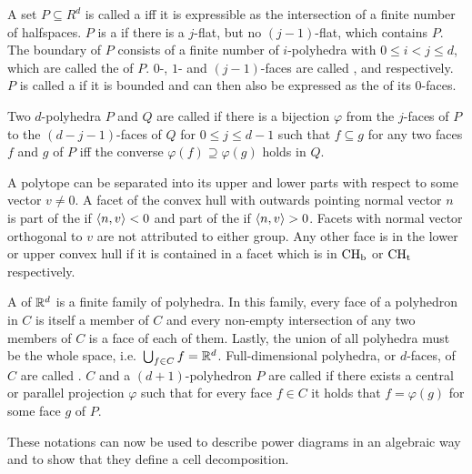 A set $P \subseteq R^d$ is called a  iff it is expressible as the intersection of a finite number of halfspaces.
$P$ is a  if there is a $j$-flat, but no $(j-1)$-flat, which contains $P$.
The boundary of $P$ consists of a finite number of $i$-polyhedra with $0 \leq i < j \leq d$, which are called the  of $P$.
$0$-, $1$- and $(j - 1)$-faces are called ,  and  respectively.
$P$ is called a  if it is bounded and can then also be expressed as the  of its $0$-faces.

Two $d$-polyhedra $P$ and $Q$ are called  if there is a bijection $\varphi$ from the $j$-faces of $P$ to the $(d-j-1)$-faces of $Q$ for $0 \leq j \leq d  -1$ such that $f \subseteq g$ for any two faces $f$ and $g$ of $P$ iff the converse $\varphi(f) \supseteq \varphi(g)$ holds in $Q$.

A polytope can be separated into its upper and lower parts with respect to some vector $v \neq 0$.
A facet of the convex hull with outwards pointing normal vector $n$ is part of the  if $\left\langle n, v \right\rangle < 0$ and part of the  if $\left\langle n, v \right\rangle > 0$.
Facets with normal vector orthogonal to $v$ are not attributed to either group.
Any other face is in the lower or upper convex hull if it is contained in a facet which is in $\operatorname{CH_b}$ or $\operatorname{CH_t}$ respectively.

A  of $\mathbb{R}^d$ is a finite family of polyhedra.
In this family, every face of a polyhedron in $C$ is itself a member of $C$ and every non-empty intersection of any two members of $C$ is a face of each of them.
Lastly, the union of all polyhedra must be the whole space, i.e.~$\bigcup_{f \in C} f = \mathbb{R}^d$.
Full-dimensional polyhedra, or $d$-faces, of $C$ are called .
$C$ and a $(d+1)$-polyhedron $P$ are called  if there exists a central or parallel projection $\varphi$ such that for every face $f \in C$ it holds that $f = \varphi(g)$ for some face $g$ of $P$.

These notations can now be used to describe power diagrams in an algebraic way and to show that they define a cell decomposition.

